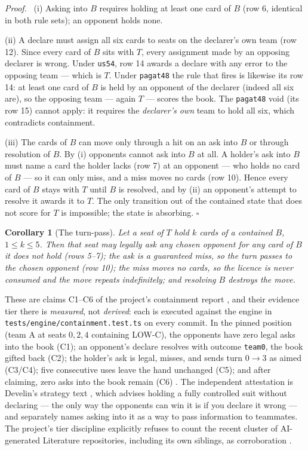 \documentclass[11pt]{article}
\newtheorem{corollary}{Corollary}
\newenvironment{proofenv}{\par\noindent\textit{Proof.}\ }{\hfill$\square$\par\medskip}
\newcommand{\code}[1]{\texttt{#1}}
\begin{document}
\begin{proofenv}
(i) Asking into $B$ requires holding at least one card of $B$ (row 6, identical
in both rule sets); an opponent holds none.

(ii) A declare must assign all six cards to seats on the declarer's own team
(row 12). Since every card of $B$ sits with $T$, every assignment made by an
opposing declarer is wrong. Under \code{us54}, row 14 awards a declare with any
error to the opposing team --- which is $T$. Under \code{pagat48} the rule that
fires is likewise its row 14: at least one card of $B$ is held by an opponent
of the declarer (indeed all six are), so the opposing team --- again $T$ ---
scores the book. The \code{pagat48} void (its row 15) cannot apply: it requires
the \emph{declarer's own} team to hold all six, which contradicts containment.

(iii) The cards of $B$ can move only through a hit on an ask into $B$ or
through resolution of $B$. By (i) opponents cannot ask into $B$ at all. A
holder's ask into $B$ must name a card the holder lacks (row 7) at an opponent
--- who holds no card of $B$ --- so it can only miss, and a miss moves no
cards (row 10). Hence every card of $B$ stays with $T$ until $B$ is resolved,
and by (ii) an opponent's attempt to resolve it awards it to $T$. The only
transition out of the contained state that does not score for $T$ is
impossible; the state is absorbing.
\end{proofenv}

\begin{corollary}[The turn-pass]
\label{cor:pass}
Let a seat of $T$ hold $k$ cards of a contained $B$, $1 \le k \le 5$. Then that
seat may legally ask any chosen opponent for any card of $B$ it does not hold
(rows 5--7); the ask is a guaranteed miss, so the turn passes to the chosen
opponent (row 10); the miss moves no cards, so the licence is never consumed
and the move repeats indefinitely; and resolving $B$ destroys the move.
\end{corollary}

These are claims C1--C6 of the project's containment report \cite{containment},
and their evidence tier there is \emph{measured}, not \emph{derived}: each is
executed against the engine in \code{tests/engine/containment.test.ts} on every
commit. In the pinned position (team A at seats $0,2,4$ containing LOW-C), the
opponents have zero legal asks into the book (C1); an opponent's declare
resolves with outcome \code{team0}, the book gifted back (C2); the holder's ask
is legal, misses, and sends turn $0 \to 3$ as aimed (C3/C4); five consecutive
uses leave the hand unchanged (C5); and after claiming, zero asks into the book
remain (C6) \cite{containment}. The independent attestation is Develin's
strategy text \cite{develin}, which advises holding a fully controlled suit
without declaring --- the only way the opponents can win it is if you declare
it wrong --- and separately names asking into it as a way to pass information
to teammates. The project's tier discipline explicitly refuses to count the
recent cluster of AI-generated Literature repositories, including its own
siblings, as corroboration \cite{containment}.
\end{document}
